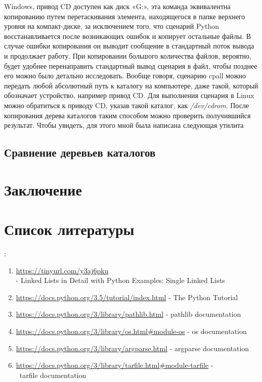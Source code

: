 \documentclass[12pt]{article}
\begin{document}
Windows, привод CD доступен как диск «G:», эта команда эквивалентна
копированию путем перетаскивания элемента, находящегося в папке
верхнего уровня на компакт-диске, за исключением того, что сценарий Python восстанавливается после возникающих ошибок и копирует
остальные файлы. В случае ошибки копирования он выводит сообщение в стандартный поток вывода и продолжает работу. При копировании большого количества файлов, вероятно, будет удобнее перенаправить стандартный вывод сценария в файл, чтобы позднее его можно
было детально исследовать.
Вообще говоря, сценарию cpall можно передать любой абсолютный
путь к каталогу на компьютере, даже такой, который обозначает устройство, например привод CD. Для выполнения сценария в Linux можно обратиться к приводу CD, указав такой каталог, как \textit{/dev/cdrom}.
После копирования дерева каталогов таким способом можно проверить получившийся результат. Чтобы увидеть, для этого мной была написана следующая утилита
\subsection{Сравнение деревьев каталогов}
\section{Заключение}
\section{Список литературы}:
\begin{enumerate}
\item \url{https://tinyurl.com/y3aj6pku} \\ - Linked Lists in Detail with Python Examples: Single Linked Lists
\item \url{https://docs.python.org/3.5/tutorial/index.html} - The Python Tutorial
\item \url{https://docs.python.org/3/library/pathlib.html} - pathlib documentation
\item \url{https://docs.python.org/3/library/os.html#module-os} - os documentation
\item \url{https://docs.python.org/3/library/argparse.html} - argparse documentation
\item \url{https://docs.python.org/3/library/tarfile.html#module-tarfile} - \\\ tarfile documentation
\end{enumerate}
\end{document}
